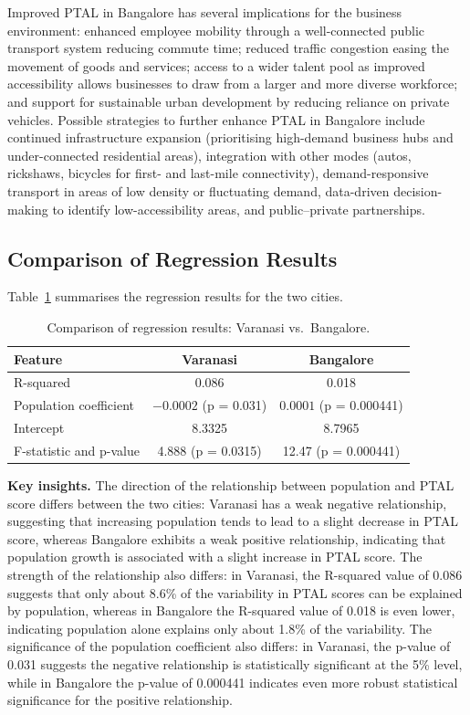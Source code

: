 \documentclass[11pt]{article}
\begin{document}
Improved PTAL in Bangalore has several implications for the business environment: enhanced
employee mobility through a well-connected public transport system reducing commute time;
reduced traffic congestion easing the movement of goods and services; access to a wider talent
pool as improved accessibility allows businesses to draw from a larger and more diverse
workforce; and support for sustainable urban development by reducing reliance on private
vehicles. Possible strategies to further enhance PTAL in Bangalore include continued
infrastructure expansion (prioritising high-demand business hubs and under-connected residential
areas), integration with other modes (autos, rickshaws, bicycles for first- and last-mile
connectivity), demand-responsive transport in areas of low density or fluctuating demand,
data-driven decision-making to identify low-accessibility areas, and public--private
partnerships.

\subsection{Comparison of Regression Results}

Table~\ref{tab:comparison} summarises the regression results for the two cities.

\begin{table}[H]
\centering
\caption{Comparison of regression results: Varanasi vs.\ Bangalore.}
\label{tab:comparison}
\begin{tabular}{lcc}
\toprule
\textbf{Feature} & \textbf{Varanasi} & \textbf{Bangalore} \\
\midrule
R-squared & 0.086 & 0.018 \\
Population coefficient & $-0.0002$ (p = 0.031) & $0.0001$ (p = 0.000441) \\
Intercept & 8.3325 & 8.7965 \\
F-statistic and p-value & 4.888 (p = 0.0315) & 12.47 (p = 0.000441) \\
\bottomrule
\end{tabular}
\end{table}

\textbf{Key insights.} The direction of the relationship between population and PTAL score
differs between the two cities: Varanasi has a weak negative relationship, suggesting that
increasing population tends to lead to a slight decrease in PTAL score, whereas Bangalore
exhibits a weak positive relationship, indicating that population growth is associated with a
slight increase in PTAL score. The strength of the relationship also differs: in Varanasi, the
R-squared value of 0.086 suggests that only about 8.6\% of the variability in PTAL scores can be
explained by population, whereas in Bangalore the R-squared value of 0.018 is even lower,
indicating population alone explains only about 1.8\% of the variability. The significance of the
population coefficient also differs: in Varanasi, the p-value of 0.031 suggests the negative
relationship is statistically significant at the 5\% level, while in Bangalore the p-value of
0.000441 indicates even more robust statistical significance for the positive relationship.
\end{document}
